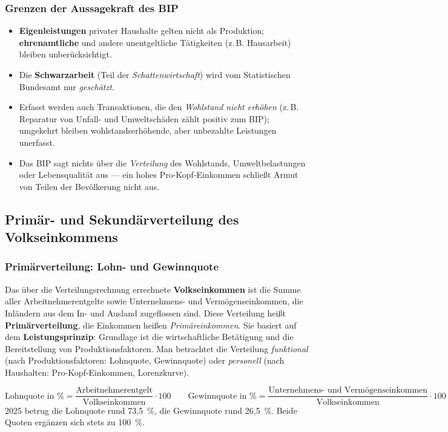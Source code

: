 \documentclass[11pt, a4paper]{article}
\begin{document}
\subsubsection{Grenzen der Aussagekraft des BIP}

\begin{itemize}
  \item \textbf{Eigenleistungen} privater Haushalte gelten nicht als Produktion;
    \textbf{ehrenamtliche} und andere unentgeltliche Tätigkeiten (z.\,B. Hausarbeit)
    bleiben unberücksichtigt.
  \item Die \textbf{Schwarzarbeit} (Teil der \emph{Schattenwirtschaft}) wird vom
    Statistischen Bundesamt nur \emph{geschätzt}.
  \item Erfasst werden auch Transaktionen, die den \emph{Wohlstand nicht erhöhen} (z.\,B.
    Reparatur von Unfall- und Umweltschäden zählt positiv zum BIP); umgekehrt bleiben
    wohlstandserhöhende, aber unbezahlte Leistungen unerfasst.
  \item Das BIP sagt nichts über die \emph{Verteilung} des Wohlstands, Umweltbelastungen
    oder Lebensqualität aus --- ein hohes Pro-Kopf-Einkommen schließt Armut von Teilen
    der Bevölkerung nicht aus.
\end{itemize}

\subsection{Primär- und Sekundärverteilung des Volkseinkommens}

\subsubsection{Primärverteilung: Lohn- und Gewinnquote}

Das über die Verteilungsrechnung errechnete \textbf{Volkseinkommen} ist die Summe aller
Arbeitnehmerentgelte sowie Unternehmens- und Vermögenseinkommen, die Inländern aus dem
In- und Ausland zugeflossen sind. Diese Verteilung heißt \textbf{Primärverteilung}, die
Einkommen heißen \emph{Primäreinkommen}. Sie basiert auf dem \textbf{Leistungsprinzip}:
Grundlage ist die wirtschaftliche Betätigung und die Bereitstellung von
Produktionsfaktoren. Man betrachtet die Verteilung \emph{funktional} (nach
Produktionsfaktoren: Lohnquote, Gewinnquote) oder \emph{personell} (nach Haushalten:
Pro-Kopf-Einkommen, Lorenzkurve).

\begin{merksatz}[title={\bfseries Formeln: Lohnquote und Gewinnquote}]
\[
\text{Lohnquote in \%} = \frac{\text{Arbeitnehmerentgelt}}{\text{Volkseinkommen}} \cdot 100
\qquad
\text{Gewinnquote in \%} = \frac{\text{Unternehmens- und Vermögenseinkommen}}{\text{Volkseinkommen}} \cdot 100
\]
2025 betrug die Lohnquote rund 73,5~\%, die Gewinnquote rund 26,5~\%. Beide Quoten ergänzen
sich stets zu 100~\%.
\end{merksatz}
\end{document}
